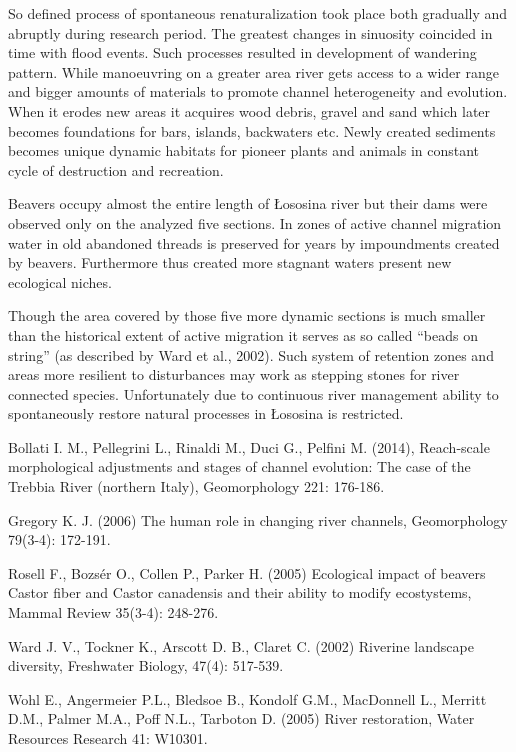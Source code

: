 {	So defined process of spontaneous renaturalization took place both gradually and abruptly during research period. The greatest changes in sinuosity coincided in time with flood events. Such processes resulted in development of wandering pattern. While manoeuvring on a greater area river gets access to a wider range and bigger amounts of materials to promote channel heterogeneity and evolution. When it erodes new areas it acquires wood debris, gravel and sand which later becomes foundations for bars, islands, backwaters etc. Newly created sediments becomes unique dynamic habitats for pioneer plants and animals in constant cycle of destruction and recreation.
	
	Beavers occupy almost the entire length of Łososina river but their dams were observed only on the analyzed five sections. In zones of active channel migration water in old abandoned threads is preserved for years by impoundments created by beavers. Furthermore thus created more stagnant waters present new ecological niches.
	
	Though the area covered by those five more dynamic sections is much smaller than the historical extent of active migration it serves as so called “beads on string” (as described by Ward et al., 2002). Such system of retention zones and areas more resilient to disturbances may work as stepping stones for river connected species. Unfortunately due to continuous river management ability to spontaneously restore natural processes in Łososina is restricted.
}%

{Bollati I. M., Pellegrini L., Rinaldi M., Duci G., Pelfini M. (2014), Reach-scale morphological adjustments and stages of channel evolution: The case of the Trebbia River (northern Italy), Geomorphology 221: 176-186. 
	
	Gregory K. J. (2006) The human role in changing river channels, Geomorphology 79(3-4): 172-191.
	
	Rosell F., Bozsér O., Collen P., Parker H. (2005) Ecological impact of beavers Castor fiber and Castor canadensis and their ability to modify ecostystems, Mammal Review 35(3-4): 248-276. 
	
	Ward J. V., Tockner K., Arscott D. B., Claret C. (2002) Riverine landscape diversity, Freshwater Biology, 47(4): 517-539.
	
	Wohl E., Angermeier P.L., Bledsoe B., Kondolf G.M., MacDonnell L., Merritt D.M., Palmer M.A., Poff N.L., Tarboton D. (2005) River restoration, Water Resources Research 41: W10301.
}%

